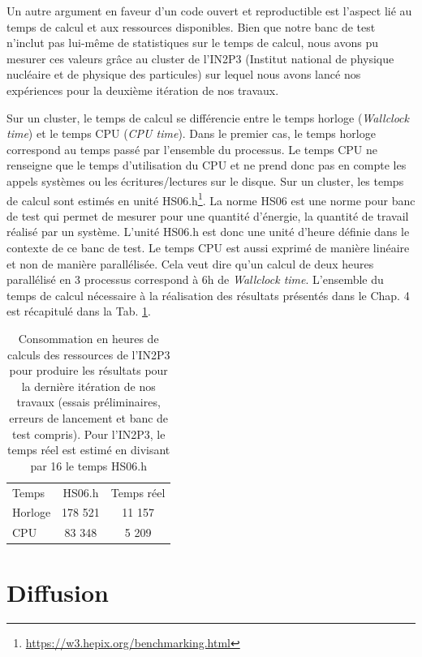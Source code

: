 Un autre argument en faveur d'un code ouvert et reproductible est l'aspect lié au temps de calcul et aux ressources disponibles. Bien que notre banc de test n'inclut pas lui-même de statistiques sur le temps de calcul, nous avons pu mesurer ces valeurs grâce au cluster de l'IN2P3 (Institut national de physique nucléaire et de physique des particules) sur lequel nous avons lancé nos expériences pour la deuxième itération de nos travaux. 

Sur un cluster, le temps de calcul se différencie entre le temps horloge (\textit{Wallclock time}) et le temps CPU (\textit{CPU time}). Dans le premier cas, le temps horloge correspond au temps passé par l'ensemble du processus. Le temps CPU ne renseigne que le temps d'utilisation du CPU et ne prend donc pas en compte les appels systèmes ou les écritures/lectures sur le disque. Sur un cluster, les temps de calcul sont estimés en unité HS06.h\footnote{\url{https://w3.hepix.org/benchmarking.html}}. La norme HS06 est une norme pour banc de test qui permet de mesurer pour une quantité d'énergie, la quantité de travail réalisé par un système. L'unité HS06.h est donc une unité d'heure définie dans le contexte de ce banc de test. Le temps CPU est aussi exprimé de manière linéaire et non de manière parallélisée. Cela veut dire qu'un calcul de deux heures parallélisé en 3 processus correspond à 6h de \textit{Wallclock time}. L'ensemble du temps de calcul nécessaire à la réalisation des résultats présentés dans le Chap. 4 est récapitulé dans la Tab. \ref{tab:consumption_in2p3}.

\begin{table}
    \centering
    \begin{tabular}{lcc}
        \hline
        Temps         & HS06.h   & Temps réel \\
        Horloge       &  178 521 &    11 157  \\
        CPU           &  83 348  &     5 209  \\
    \end{tabular}
    \caption{Consommation en heures de calculs des ressources de l'IN2P3 pour produire les résultats pour la dernière itération de nos travaux (essais préliminaires, erreurs de lancement et banc de test compris). Pour l'IN2P3, le temps réel est estimé en divisant par 16 le temps HS06.h}
    \label{tab:consumption_in2p3}
\end{table}


\section{Diffusion}

